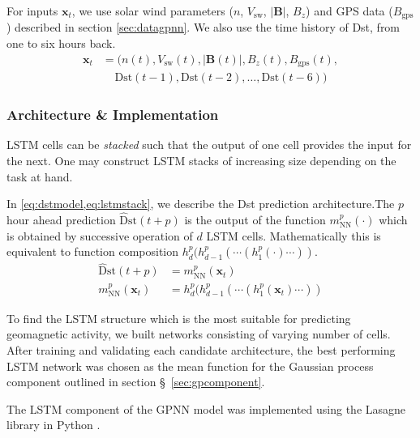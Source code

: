 For inputs $\mathbf{x}_t$, we use solar wind parameters ($n$, $V_{\text{sw}}$, $|\mathbf{B}|$, $B_{z}$) 
and GPS data ($B_{\text{gps}}$) described in section \ref{sec:datagpnn}. We also use the time history of Dst, 
from one to six hours back.
%
\begin{equation}\label{eq:lstminputs}
	\begin{aligned}
		\mathbf{x}_t &= (n \left( t \right) , V_{\text{sw}}\left( t \right), 
		|\mathbf{B}\left( t \right)|, B_{z}\left( t \right) , B_{\text{gps}} \left( t \right),\\ 
		& \ \  \ \  \ \mathrm{Dst} \left( t-1 \right), \mathrm{Dst} \left( t-2 \right) , \ldots , 
		\mathrm{Dst} \left( t-6 \right) )
	\end{aligned}
\end{equation}

\subsubsection*{Architecture \& Implementation}

LSTM cells can be \emph{stacked} such that the output of one cell provides the input for the next. 
One may construct LSTM stacks of increasing size depending on the task at hand.  

In \cref{eq:dstmodel,eq:lstmstack}, we describe the Dst prediction architecture.The $p$ hour 
ahead prediction $\mathrm{\hat{D}st} \left(t + p \right)$ is the output of the function $m^{p}_{\text{NN}}(\cdot)$ which 
is obtained by successive operation of $d$ LSTM cells. Mathematically this is equivalent to function composition 
$h^{p}_{d} ( h^{p}_{d-1}( \cdots (h^{p}_{1}(\cdot)\cdots))$.
%
\begin{align}
	\mathrm{\hat{D}st} \left(t + p \right) &= 
	m^{p}_{\text{NN}} (\mathbf{x}_t) \label{eq:dstmodel}\\
	m^{p}_{\text{NN}} (\mathbf{x}_t) &= 
	h^{p}_{d} ( h^{p}_{d-1}( \cdots (h^{p}_{1}(\mathbf{x}_t)\cdots)) \label{eq:lstmstack}
\end{align}

To find the LSTM structure which is the most suitable for predicting geomagnetic activity, we 
built networks consisting of varying number of cells. After training and validating each candidate architecture, 
the best performing LSTM network was chosen as the mean function for the Gaussian process component outlined in 
section \S~\ref{sec:gpcomponent}.

The LSTM component of the GPNN model was implemented using the Lasagne library in Python 
\citep{lasagne,theanoshort}. 

